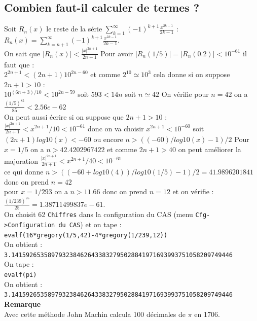 \documentclass[a4paper,11pt]{book}
\begin{document}
\subsection{Combien faut-il calculer de termes ?}
Soit $R_n(x)$ le reste de la s\'erie $\sum_{k=1}^\infty (-1)^{k+1}\frac{x^{2k-1}}{2k-1}$ : $R_n(x)=\sum_{k=n+1}^\infty (-1)^{k+1}\frac{x^{2k-1}}{2k-1}$.\\
On sait que $|R_n(x)|<\frac{|x|^{2n+1}}{2n+1}$
Pour avoir $|R_n(1/5)|=|R_n(0.2)|<10^{-61}$ il faut que :\\
$2^{2n+1}<(2n+1)10^{2n-60}$ et comme $2^10\simeq 10^3$ cela donne si on 
suppose $2n+1>10$ :\\
$10^{(6n+3)/10}<10^{2n-59}$ soit $593<14n$ soit $n\simeq 42$
On v\'erifie pour $n=42$ on a $\frac{(1/5)^{85}}{85}<2.56e-62$\\
On peut aussi \'ecrire si on suppose que $2n+1>10$ :\\
$\frac{|x|^{2n+1}}{2n+1}<x^{2n+1}/10<10^{-61}$
donc on va choisir $x^{2n+1}<10^{-60}$ soit $(2n+1)log10(x)<-60$
ou encore $n>((-60)/log10(x)-1)/2$
Pour $x=1/5$ on a $n>42.4202967422$ et comme $2n+1>40$ on peut am\'eliorer la 
majoration $\frac{|x|^{2n+1}}{2n+1}<x^{2n+1}/40<10^{-61}$\\
ce qui donne $n>((-60+log10(4))/log10(1/5)-1)/2=41.9896201841$ donc on prend 
$n=42$\\
pour $x=1/293$ on a $n>11.66$ donc on prend $n=12$ et on
v\'erifie : $\frac{(1/239)^{25}}{25}=1.38711499837e-61$.\\
On choisit 62 {\tt Chiffres}  dans la configuration du CAS (menu
{\tt Cfg->Configuration du CAS}) et on tape :\\
{\tt evalf(16*gregory(1/5,42)-4*gregory(1/239,12))}\\
On obtient :\\
{\tt 3.1415926535897932384626433832795028841971693993751058209749446}\\
On tape :\\
{\tt evalf(pi)}\\
On obtient :\\
{\tt 3.1415926535897932384626433832795028841971693993751058209749446}\\
{\bf Remarque}\\
Avec cette m\'ethode John Machin calcula 100 d\'ecimales de $\pi$ en 1706.
\end{document}
